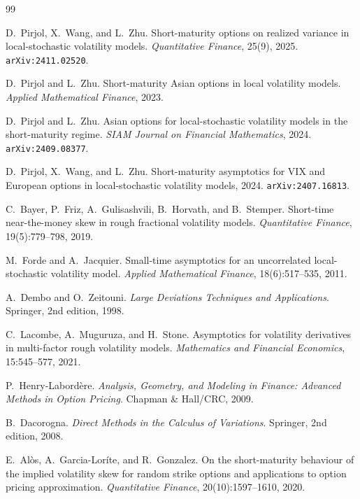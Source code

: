 \documentclass[12pt]{article}
\begin{document}

\begin{thebibliography}{99}

 D.~Pirjol, X.~Wang, and L.~Zhu.
  Short-maturity options on realized variance in local-stochastic volatility models.
  \textit{Quantitative Finance}, 25(9), 2025.
  \texttt{arXiv:2411.02520}.

 D.~Pirjol and L.~Zhu.
  Short-maturity Asian options in local volatility models.
  \textit{Applied Mathematical Finance}, 2023.

 D.~Pirjol and L.~Zhu.
  Asian options for local-stochastic volatility models in the short-maturity regime.
  \textit{SIAM Journal on Financial Mathematics}, 2024.
  \texttt{arXiv:2409.08377}.

 D.~Pirjol, X.~Wang, and L.~Zhu.
  Short-maturity asymptotics for VIX and European options in
  local-stochastic volatility models, 2024.
  \texttt{arXiv:2407.16813}.

 C.~Bayer, P.~Friz, A.~Gulisashvili, B.~Horvath, and B.~Stemper.
  Short-time near-the-money skew in rough fractional volatility models.
  \textit{Quantitative Finance}, 19(5):779--798, 2019.

 M.~Forde and A.~Jacquier.
  Small-time asymptotics for an uncorrelated local-stochastic volatility model.
  \textit{Applied Mathematical Finance}, 18(6):517--535, 2011.

 A.~Dembo and O.~Zeitouni.
  \textit{Large Deviations Techniques and Applications}.
  Springer, 2nd edition, 1998.

 C.~Lacombe, A.~Muguruza, and H.~Stone.
  Asymptotics for volatility derivatives in multi-factor rough volatility models.
  \textit{Mathematics and Financial Economics}, 15:545--577, 2021.

 P.~Henry-Labord\`ere.
  \textit{Analysis, Geometry, and Modeling in Finance: Advanced Methods in
  Option Pricing}.
  Chapman \& Hall/CRC, 2009.

 B.~Dacorogna.
  \textit{Direct Methods in the Calculus of Variations}.
  Springer, 2nd edition, 2008.

 E.~Al\`os, A.~Garcia-Lor\'ite, and R.~Gonzalez.
  On the short-maturity behaviour of the implied volatility skew for random
  strike options and applications to option pricing approximation.
  \textit{Quantitative Finance}, 20(10):1597--1610, 2020.

\end{thebibliography}
\end{document}
